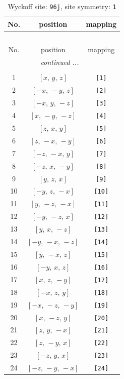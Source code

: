 \documentclass[fleqn,8pt]{jsarticle}
\begin{document}
\begin{longtable}{ccc}
\caption{Wyckoff site: {\tt 96j}, site symmetry: {\tt 1}}
 \\
 \hline \hline
No. & position & mapping \\ \hline \endfirsthead

\multicolumn{2}{l}{\tablename\ \thetable{}} \\
 \hline \hline
No. & position & mapping \\ \hline \endhead

 \hline \hline
\multicolumn{2}{r}{\footnotesize\it continued ...} \\ \endfoot

 \hline \hline
\multicolumn{2}{r}{} \\ \endlastfoot

1 & $\left[ x,\, y,\, z \right]$ & {\tt [1]} \\ \hline
2 & $\left[ - x,\, - y,\, z \right]$ & {\tt [2]} \\ \hline
3 & $\left[ - x,\, y,\, - z \right]$ & {\tt [3]} \\ \hline
4 & $\left[ x,\, - y,\, - z \right]$ & {\tt [4]} \\ \hline
5 & $\left[ z,\, x,\, y \right]$ & {\tt [5]} \\ \hline
6 & $\left[ z,\, - x,\, - y \right]$ & {\tt [6]} \\ \hline
7 & $\left[ - z,\, - x,\, y \right]$ & {\tt [7]} \\ \hline
8 & $\left[ - z,\, x,\, - y \right]$ & {\tt [8]} \\ \hline
9 & $\left[ y,\, z,\, x \right]$ & {\tt [9]} \\ \hline
10 & $\left[ - y,\, z,\, - x \right]$ & {\tt [10]} \\ \hline
11 & $\left[ y,\, - z,\, - x \right]$ & {\tt [11]} \\ \hline
12 & $\left[ - y,\, - z,\, x \right]$ & {\tt [12]} \\ \hline
13 & $\left[ y,\, x,\, - z \right]$ & {\tt [13]} \\ \hline
14 & $\left[ - y,\, - x,\, - z \right]$ & {\tt [14]} \\ \hline
15 & $\left[ y,\, - x,\, z \right]$ & {\tt [15]} \\ \hline
16 & $\left[ - y,\, x,\, z \right]$ & {\tt [16]} \\ \hline
17 & $\left[ x,\, z,\, - y \right]$ & {\tt [17]} \\ \hline
18 & $\left[ - x,\, z,\, y \right]$ & {\tt [18]} \\ \hline
19 & $\left[ - x,\, - z,\, - y \right]$ & {\tt [19]} \\ \hline
20 & $\left[ x,\, - z,\, y \right]$ & {\tt [20]} \\ \hline
21 & $\left[ z,\, y,\, - x \right]$ & {\tt [21]} \\ \hline
22 & $\left[ z,\, - y,\, x \right]$ & {\tt [22]} \\ \hline
23 & $\left[ - z,\, y,\, x \right]$ & {\tt [23]} \\ \hline
24 & $\left[ - z,\, - y,\, - x \right]$ & {\tt [24]} \\
\end{longtable}
\end{document}
